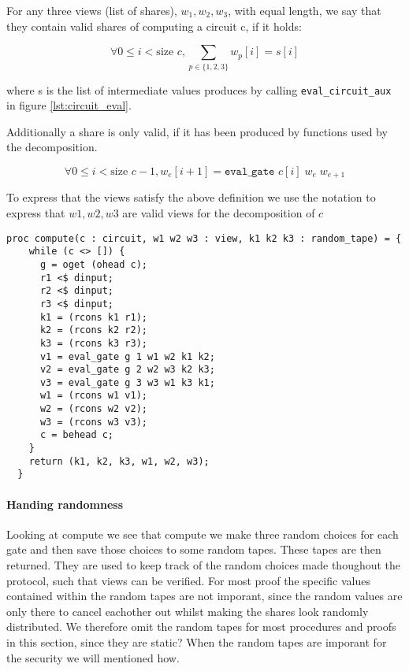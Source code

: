 \begin{definition}
  \label{def:decomp:valid_view}
  For any three views (list of shares), $w_{1}, w_{2}, w_{3}$, with equal length, we
  say that they contain valid shares of computing a circuit c, if it holds:

  \begin{equation}
    \label{eq:decomp:view:sum}
    \forall 0 \leq i < \text{size } c,
      \sum_{p \in \{1,2,3\}} w_{p}[i] = s[i]
  \end{equation}

  where s is the list of intermediate values produces by calling
  \texttt{eval\_circuit\_aux} in figure \ref{lst:circuit_eval}.

  Additionally a share is only valid, if it has been produced by functions used
  by the decomposition.

  \begin{equation}
    \label{eq:decomp:valid}
      \forall 0 \leq i < \text{size
                                                   } c - 1,  w_{e}[i+1] = \texttt{eval\_gate } c[i]\; w_{e} \; w_{e+1}
  \end{equation}

  To express that the views satisfy the above definition we use the notation
   to express that $w1, w2, w3$ are valid views for the
  decomposition of $c$

\end{definition}


\begin{lstlisting}[float,label=lst:decomp_aux,caption= Incremental decomposition procedure]
  proc compute(c : circuit, w1 w2 w3 : view, k1 k2 k3 : random_tape) = {
    while (c <> []) {
      g = oget (ohead c);
      r1 <$ dinput;
      r2 <$ dinput;
      r3 <$ dinput;
      k1 = (rcons k1 r1);
      k2 = (rcons k2 r2);
      k3 = (rcons k3 r3);
      v1 = eval_gate g 1 w1 w2 k1 k2;
      v2 = eval_gate g 2 w2 w3 k2 k3;
      v3 = eval_gate g 3 w3 w1 k3 k1;
      w1 = (rcons w1 v1);
      w2 = (rcons w2 v2);
      w3 = (rcons w3 v3);
      c = behead c;
    }
    return (k1, k2, k3, w1, w2, w3);
  }
\end{lstlisting}

\paragraph{Handing randomness}
\label{subsec:decomp:randomness}
Looking at compute we see that compute we make three random choices for each gate and then save those choices to some random tapes. These tapes are then returned. They are used to keep track of the random choices made thoughout the protocol, such that views can be verified. For most proof the specific values contained within the random tapes are not imporant, since the random values are only there to cancel eachother out whilst making the shares look randomly distributed.
We therefore omit the random tapes for most procedures and proofs in this section, since they are static?
When the random tapes are imporant for the security we will mentioned how.

